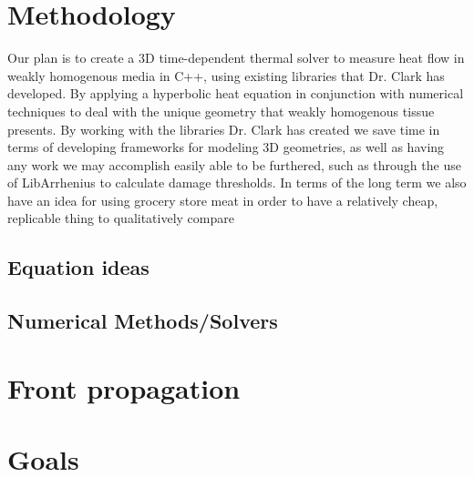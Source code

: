 \documentclass[12pt]{article}
\begin{document}
\section{Methodology}

Our plan is to create a 3D time-dependent thermal solver to measure heat flow in weakly homogenous media in C++, using existing libraries that Dr. Clark has developed. By applying a hyperbolic heat equation in conjunction with numerical techniques to deal with the unique geometry that weakly homogenous tissue presents. By working with the libraries Dr. Clark has created we save time in terms of developing frameworks for modeling 3D geometries, as well as having any work we may accomplish easily able to be furthered, such as through the use of LibArrhenius to calculate damage thresholds. In terms of the long term we also have an idea for using grocery store meat in order to have a relatively cheap, replicable thing to qualitatively compare

\subsection{Equation ideas}
\subsection{Numerical Methods/Solvers}
\section{Front propagation}
\section{Goals}
\end{document}
